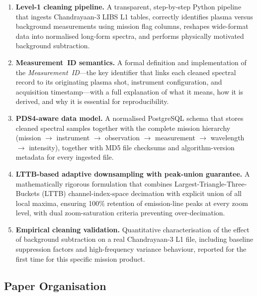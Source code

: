 \documentclass[a4paper,twocolumn,10pt]{article}
\begin{document}
\begin{enumerate}[label=\textbf{(C\arabic*)},leftmargin=*,itemsep=3pt]
  \item \textbf{Level-1 cleaning pipeline.}  A transparent,
    step-by-step Python pipeline that ingests Chandrayaan-3 LIBS L1
    tables, correctly identifies plasma versus background measurements
    using mission flag columns, reshapes wide-format data into
    normalised long-form spectra, and performs physically motivated
    background subtraction.

  \item \textbf{Measurement~ID semantics.}  A formal definition and
    implementation of the \emph{Measurement~ID}---the key identifier
    that links each cleaned spectral record to its originating plasma
    shot, instrument configuration, and acquisition timestamp---with a
    full explanation of what it means, how it is derived, and why it
    is essential for reproducibility.

  \item \textbf{PDS4-aware data model.}  A normalised PostgreSQL
    schema that stores cleaned spectral samples together with the
    complete mission hierarchy (mission $\rightarrow$ instrument
    $\rightarrow$ observation $\rightarrow$ measurement $\rightarrow$
    wavelength $\rightarrow$ intensity), together with MD5 file
    checksums and algorithm-version metadata for every ingested file.

  \item \textbf{LTTB-based adaptive downsampling with peak-union
    guarantee.}  A mathematically rigorous formulation that combines
    Largest-Triangle-Three-Buckets (LTTB) channel-index-space
    decimation with explicit union of all local maxima, ensuring
    100\% retention of emission-line peaks at every zoom level, with
    dual zoom-saturation criteria preventing over-decimation.

  \item \textbf{Empirical cleaning validation.}  Quantitative
    characterisation of the effect of background subtraction on a real
    Chandrayaan-3 L1 file, including baseline suppression factors and
    high-frequency variance behaviour, reported for the first time for
    this specific mission product.
\end{enumerate}

\subsection{Paper Organisation}
\end{document}
